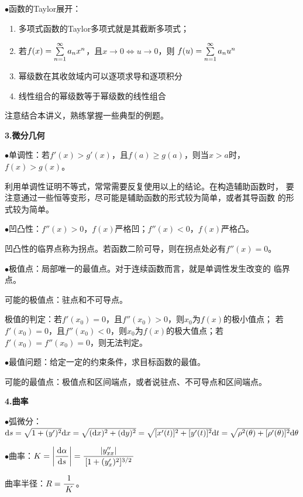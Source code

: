 $\bullet$函数的Taylor展开：
\begin{enumerate}[(1)]
  \setlength{\itemindent}{1cm}
  \item 多项式函数的Taylor多项式就是其截断多项式；
  \item 若$f(x)=\sum\limits_{n=1}^{\infty} a_nx^n$，且$x\to0\Leftrightarrow u\to0$，则
  $f(u)=\sum\limits_{n=1}^{\infty} a_nu^n$
  \item 幂级数在其收敛域内可以逐项求导和逐项积分
  \item 线性组合的幂级数等于幂级数的线性组合
\end{enumerate}

注意结合本讲义，熟练掌握一些典型的例题。

{\bf 3.微分几何}

$\bullet$单调性：若$f'(x)>g'(x)$，且$f(a)\geq g(a)$，则当$x>a$时，
$f(x)>g(x)$。

利用单调性证明不等式，常常需要反复使用以上的结论。在构造辅助函数时，
要注意通过一些恒等变形，尽可能是辅助函数的形式较为简单，或者其导函数
的形式较为简单。

$\bullet$凹凸性：$f''(x)>0$，$f(x)$严格凹；$f''(x)<0$，$f(x)$严格凸。

凹凸性的临界点称为拐点。若函数二阶可导，则在拐点处必有$f''(x)=0$。

$\bullet$极值点：局部唯一的最值点。对于连续函数而言，就是单调性发生改变的
临界点。

可能的极值点：驻点和不可导点。

极值的判定：若$f'(x_0)=0$，且$f''(x_0)>0$，则$x_0$为$f(x)$的极小值点；
若$f'(x_0)=0$，且$f''(x_0)<0$，则$x_0$为$f(x)$的极大值点；若
$f'(x_0)=f''(x_0)=0$，则无法判定。

$\bullet$最值问题：给定一定的约束条件，求目标函数的最值。

可能的最值点：极值点和区间端点，或者说驻点、不可导点和区间端点。

{\bf 4.曲率}

$\bullet$弧微分：$\mathrm{d} s=\sqrt{1+(y')^2}\mathrm{d} x =\sqrt{(\mathrm{d} x)^2+(\mathrm{d} y)^2}
=\sqrt{[x'(t)]^2+[y'(t)]^2}\mathrm{d} t=\sqrt{\rho^2(\theta)+[\rho'(\theta)]^2}\mathrm{d}\theta$

$\bullet$曲率：$K=\left|\displaystyle\frac{\,{\mathrm{d}\alpha}\,}{\,{\mathrm{d} s}\,}\right|
=\displaystyle\frac{\,{|y''_{xx}|}\,}{\,{[1+(y'_x)^2]^{3/2}}\,}$

曲率半径：$R=\displaystyle\frac{\,{1}\,}{\,{K}\,}$。

\newpage

